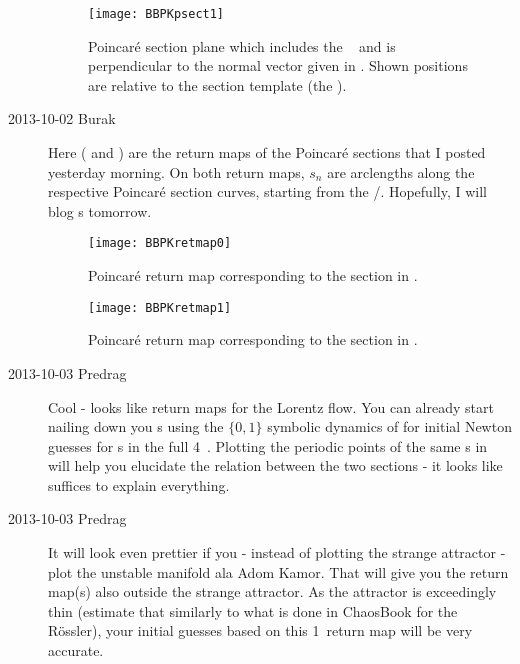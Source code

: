 \begin{description}
\begin{figure}%
  \begin{center}
  \texttt{[image: BBPKpsect1]}
  \end{center}
  \caption{
	Poincar\'e section plane which includes the \reqv\   and
	is perpendicular to the normal vector given in .
	Shown positions are relative to the section template (the \reqv ).
    }
  \label{fig:BBPKpsect1}
\end{figure}

\item[2013-10-02 Burak] Here ( and )
are the return maps of the Poincar\'e sections that I posted yesterday morning.
On both return maps, $s_n$ are arclengths along the respective Poincar\'e
section curves, starting from the \eqv /\reqv. Hopefully, I will blog \rpo s tomorrow.

\begin{figure}%
  \begin{center}
  \texttt{[image: BBPKretmap0]}
  \end{center}
  \caption{
	Poincar\'e return map corresponding to the section in .
    }
  \label{fig:BBPKretmap0}
\end{figure}

\begin{figure}%
  \begin{center}
  \texttt{[image: BBPKretmap1]}
  \end{center}
  \caption{
	Poincar\'e return map corresponding to the section in .
    }
  \label{fig:BBPKretmap1}
\end{figure}

\item[2013-10-03 Predrag] Cool - looks like return maps for the
Lorentz flow. You can already start nailing down you \rpo s using the
$\{0,1\}$ symbolic dynamics of  for initial
Newton guesses for \rpo s in the full 4\dmn\ \statesp. Plotting the
periodic points of the same \rpo s in    will
help you elucidate the relation between the two sections - it looks
like  suffices to explain everything.

\item[2013-10-03 Predrag] It will look even prettier if you - instead
of plotting the strange attractor - plot the unstable manifold ala
Adom Kamor. That will give you the return map(s) also outside the
strange attractor. As the attractor is exceedingly thin (estimate
that similarly to what is done in ChaosBook for the R\"ossler), your
initial guesses based on this 1\dmn\ return map will be very
accurate.


\end{description}
